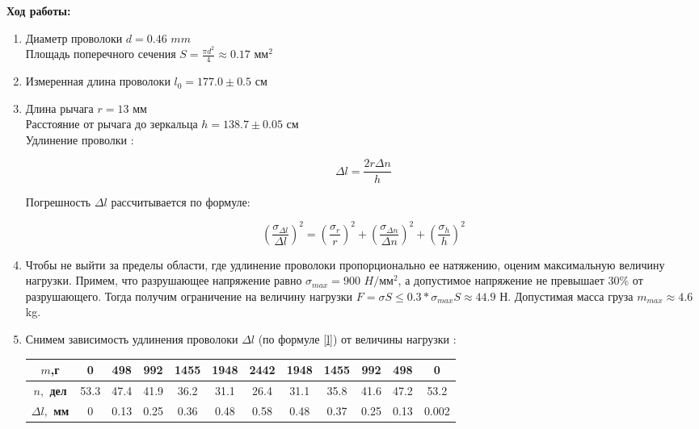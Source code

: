 \documentclass[8pt]{article}
\begin{document}
    \textbf{Ход работы:}\\
    \begin{enumerate}
    \item 
        Диаметр проволоки $d = 0.46$ $mm$ \\
        Площадь поперечного сечения $S = \frac{\pi d^2}{4} \approx 0.17$ $\text{мм}^2$\\ 
    \item 
        Измеренная длина проволоки $l_0 = 177.0 \pm 0.5$ см
    \item 
        Длина рычага $r = 13$ мм \\
        Расстояние от рычага до зеркальца $h = 138.7 \pm 0.05$ см \\
        Удлинение проволки : 

        \begin{equation} \label{l}
            \Delta l = \frac{2r\Delta n}{h}
        \end{equation}

        Погрешность $\Delta l$ рассчитывается по формуле:
    
        \begin{equation} \label{dl}
        \left(\frac{\sigma_{\Delta l}}{\Delta l}\right)^2 
        = \left(\frac{\sigma_{r}}{r}\right)^2
        + \left(\frac{\sigma_{\Delta n}}{\Delta n}\right)^2
        + \left(\frac{\sigma_{h}}{h}\right)^2
        \end{equation}
    \item
        Чтобы не выйти за пределы области, где удлинение проволоки пропорционально ее натяжению, оценим максимальную величину нагрузки. Примем, что разрушающее напряжение равно $\sigma_{max} = 900$ $H/\text{мм}^2$, а допустимое напряжение не превышает $30\%$ от разрушающего.
        Тогда получим ограничение на величину нагрузки $F = \sigma S \leq 0.3 * \sigma_{max} S \approx 44.9$ Н. 
        Допустимая масса груза $m_{max} \approx 4.6 $ kg.

    \item 
        Снимем зависимость удлинения проволоки $\Delta l$ (по формуле \eqref{l})  от величины нагрузки :
    
    
    \begin{center}
    \begin{tabular}{|c|c|c|c|c|c|c|c|c|c|c|c|}
        \hline
        \textbf{$m$,г} & 0 & 498 & 992 & 1455 & 1948 & 2442 & 1948 & 1455 & 992 & 498 & 0 \\
        \hline
        \textbf{$n,$ дел} & 53.3 & 47.4 & 41.9 & 36.2 & 31.1 & 26.4 & 31.1 & 35.8 & 41.6 & 47.2 & 53.2 \\
        \hline
        \textbf{$\Delta l,$ мм} & 0 & 0.13 & 0.25 & 0.36 & 0.48 & 0.58 & 0.48 & 0.37 & 0.25 & 0.13 & 0.002\\
        \hline
    \end{tabular}
    \end{center}


\end{enumerate}
\end{document}
